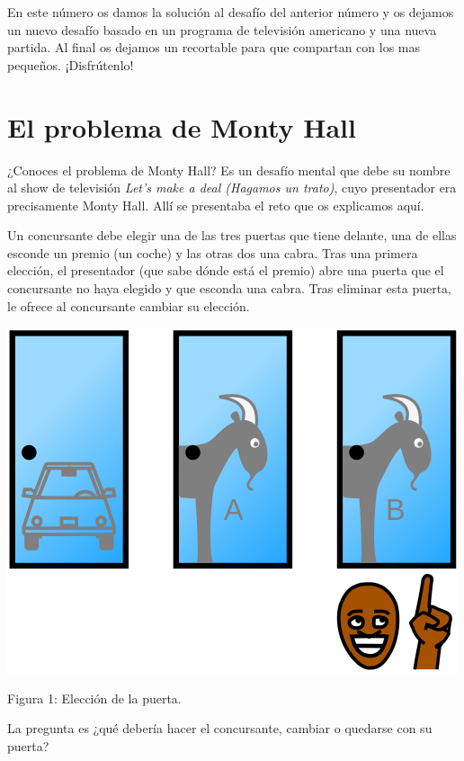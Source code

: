 \begin{multicols}{2}

\cappar

En este número os damos la solución al desafío del anterior número y os dejamos un nuevo desafío basado en un programa de televisión americano y una nueva partida. Al final os dejamos un recortable para que compartan con los mas pequeños. ¡Disfrútenlo!


\section*{El problema de Monty Hall}
¿Conoces el problema de Monty Hall? Es un desafío mental que debe su nombre al show de televisión \textit{Let's make a deal (Hagamos un trato)}, cuyo presentador era precisamente Monty Hall. Allí se presentaba el reto que os explicamos aquí.

Un concursante debe elegir una de las tres puertas que tiene delante, una de ellas esconde un premio (un coche) y las otras dos una cabra. Tras una primera elección, el presentador (que sabe dónde está el premio) abre una puerta que el concursante no haya elegido y que esconda una cabra. Tras eliminar esta puerta, le ofrece al concursante cambiar su elección.

\begin{figurebox}
  \centering \includegraphics[scale=0.25]{500px-Monty-CurlyPicksGoatB.png}

  Figura 1: Elección de la puerta.
\end{figurebox}


La pregunta es ¿qué debería hacer el concursante, cambiar o quedarse con su puerta?


\end{multicols}

